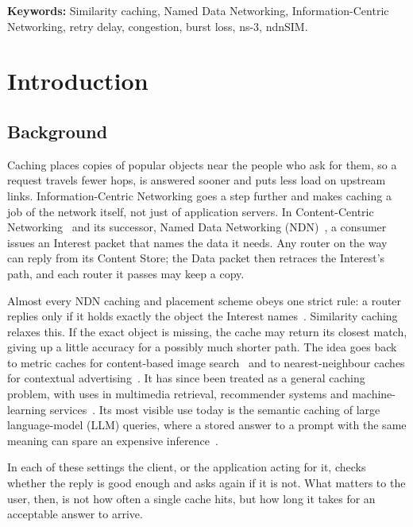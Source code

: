 \documentclass[11pt,a4paper]{article}
\begin{document}
\vspace{1em}
\noindent\textbf{Keywords:} Similarity caching, Named Data Networking, Information-Centric
Networking, retry delay, congestion, burst loss, ns-3, ndnSIM.

\newpage
{\setlength{\parskip}{0pt}\tableofcontents}
\newpage

\section{Introduction}\label{sec:intro}

\subsection{Background}
Caching places copies of popular objects near the people who ask for them, so a request travels
fewer hops, is answered sooner and puts less load on upstream links. Information-Centric Networking
goes a step further and makes caching a job of the network itself, not just of application servers.
In Content-Centric Networking~\cite{jacobson2009ccn} and its successor, Named Data Networking
(NDN)~\cite{zhang2014ndn}, a consumer issues an Interest packet that names the data it needs. Any
router on the way can reply from its Content Store; the Data packet then retraces the Interest's
path, and each router it passes may keep a copy.

Almost every NDN caching and placement scheme obeys one strict rule: a router replies only if it
holds exactly the object the Interest names~\cite{chaudhary2026ndncaching}. Similarity caching
relaxes this. If the exact object is missing, the cache may return its closest match, giving up a
little accuracy for a possibly much shorter path. The idea goes back to metric caches for
content-based image search~\cite{falchi2008metric} and to nearest-neighbour caches for contextual
advertising~\cite{pandey2009nn}. It has since been treated as a general caching problem, with uses in
multimedia retrieval, recommender systems and machine-learning services~\cite{neglia2022similarity}.
Its most visible use today is the semantic caching of large language-model (LLM) queries, where a
stored answer to a prompt with the same meaning can spare an expensive
inference~\cite{bang2023gptcache,gill2025meancache,schroeder2025vcache}.

In each of these settings the client, or the application acting for it, checks whether the reply is
good enough and asks again if it is not. What matters to the user, then, is not how often a single
cache hits, but how long it takes for an acceptable answer to arrive.
\end{document}
